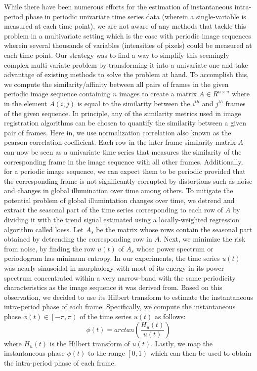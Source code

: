 \documentclass[runningheads,a4paper]{llncs}
\begin{document}
%
While there have been numerous efforts for the estimation of instantaneous intra-period phase\cite{Lu2013} in periodic univariate time series data (wherein a single-variable is measured at each time point), we are not aware of any methods that tackle this problem in a multivariate setting which is the case with periodic image sequences wherein several thousands of variables (intensities of pixels) could be measured at each time point. Our strategy was to find a way to simplify this seemingly complex multi-variate problem by transforming it into a univariate one and take advantage of existing methods to solve the problem at hand. To accomplish this, we compute the similarity/affinity between all pairs of frames in the given periodic image sequence containing $n$ images to create a matrix $A \in R^{n \times n}$ where in the element $A(i,j)$ is equal to the similarity between the $i^{th}$ and $j^{th}$ frames of the given sequence. In principle, any of the similarity metrics used in image registration algorithms can be chosen to quantify the similarity between a given pair of frames. Here in, we use normalization correlation also known as the pearson correlation coefficient. Each row in the inter-frame similarity matrix $A$ can now be seen as a univariate time series that measures the similarity of the corresponding frame in the image sequence with all other frames. Additionally, for a periodic image sequence, we can expect them to be periodic provided that the corresponding frame is not significantly corrupted by distortions such as noise and changes in global illumination over time among others. To mitigate the potential problem of global illumintation changes over time, we detrend and extract the seasonal part of the time series corresponding to each row of $A$ by dividing it with the trend signal estimated using a locally-weighted regression algorithm called loess\cite{Cleveland1990}. Let $A_s$ be the matrix whose rows contain the seasonal part obtained by detrending the corresponding row in $A$. Next, we minimize the risk from noise, by finding the row $u(t)$ of $A_s$ whose power spectrum or periodogram has minimum entropy. In our experiments, the time series $u(t)$ was nearly sinusoidal in morphology with most of its energy in its power spectrum concentrated within a very narrow-band with the same periodicity characteristics as the image sequence it was derived from. Based on this observation, we decided to use its Hilbert transform \cite{Lu2013} to estimate the instantaneous intra-period phase  of each frame. Specifically, we compute the instantaneous phase $\phi(t) \in \left [  -\pi, \pi\right )$ of the time series $u(t)$ as follows:
\begin{equation}
\phi(t) = arctan \left( \frac{H_u(t)}{u(t)}\right)
\end{equation} 
where $H_u(t)$ is the Hilbert transform of $u(t)$. Lastly, we map the instantaneous phase $\phi(t)$ to the range $\left [  0, 1\right )$ which can then be used to obtain the intra-period phase of each frame.
\end{document}
